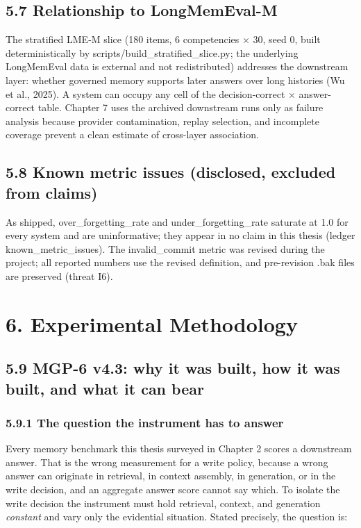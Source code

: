 \subsection{5.7 Relationship to
LongMemEval-M}\label{relationship-to-longmemeval-m}

The stratified LME-M slice (180 items, 6 competencies × 30, seed 0,
built deterministically by scripts/build\_stratified\_slice.py; the
underlying LongMemEval data is external and not redistributed) addresses
the downstream layer: whether governed memory supports later answers
over long histories (Wu et al., 2025). A system can occupy any cell of
the decision-correct × answer-correct table. Chapter 7 uses the archived
downstream runs only as failure analysis because provider contamination,
replay selection, and incomplete coverage prevent a clean estimate of
cross-layer association.

\subsection{5.8 Known metric issues (disclosed, excluded from
claims)}\label{known-metric-issues-disclosed-excluded-from-claims}

As shipped, over\_forgetting\_rate and under\_forgetting\_rate saturate
at 1.0 for every system and are uninformative; they appear in no claim
in this thesis (ledger known\_metric\_issues). The invalid\_commit
metric was revised during the project; all reported numbers use the
revised definition, and pre-revision .bak files are preserved (threat
I6).

\section{6. Experimental Methodology}\label{experimental-methodology}

\subsection{5.9 MGP-6 v4.3: why it was built, how it was built, and what
it can
bear}\label{mgp-6-v4.3-why-it-was-built-how-it-was-built-and-what-it-can-bear}

\subsubsection{5.9.1 The question the instrument has to
answer}\label{the-question-the-instrument-has-to-answer}

Every memory benchmark this thesis surveyed in Chapter 2 scores a
downstream answer. That is the wrong measurement for a write policy,
because a wrong answer can originate in retrieval, in context assembly,
in generation, or in the write decision, and an aggregate answer score
cannot say which. To isolate the write decision the instrument must hold
retrieval, context, and generation \emph{constant} and vary only the
evidential situation. Stated precisely, the question is:


